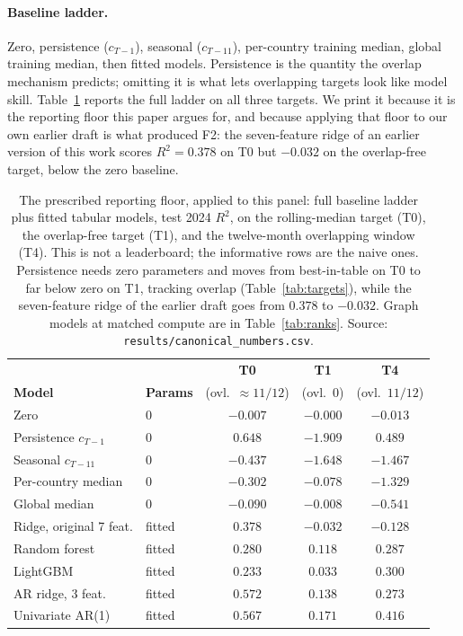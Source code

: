 \documentclass[10pt]{article}
\begin{document}
\paragraph{Baseline ladder.}
Zero, persistence ($c_{T-1}$), seasonal ($c_{T-11}$), per-country training median, global training median, then fitted models. Persistence is the quantity the overlap mechanism predicts; omitting it is what lets overlapping targets look like model skill. Table~\ref{tab:ladder} reports the full ladder on all three targets. We print it because it is the reporting floor this paper argues for, and because applying that floor to our own earlier draft is what produced F2: the seven-feature ridge of an earlier version of this work scores $R^2=0.378$ on T0 but $-0.032$ on the overlap-free target, below the zero baseline.

\begin{table}[t]
\centering
\caption{The prescribed reporting floor, applied to this panel: full baseline ladder plus fitted tabular models, test 2024 $R^2$, on the rolling-median target (T0), the overlap-free target (T1), and the twelve-month overlapping window (T4). This is not a leaderboard; the informative rows are the naive ones. Persistence needs zero parameters and moves from best-in-table on T0 to far below zero on T1, tracking overlap (Table~\ref{tab:targets}), while the seven-feature ridge of the earlier draft goes from $0.378$ to $-0.032$. Graph models at matched compute are in Table~\ref{tab:ranks}. Source: \texttt{results/canonical\_numbers.csv}.}
\label{tab:ladder}
\footnotesize
\begin{tabular}{l l ccc}
\toprule
& & \textbf{T0} & \textbf{T1} & \textbf{T4} \\
\textbf{Model} & \textbf{Params} & (ovl.\ $\approx 11/12$) & (ovl.\ $0$) & (ovl.\ $11/12$) \\
\midrule
Zero & $0$ & $-0.007$ & $-0.000$ & $-0.013$ \\
Persistence $c_{T-1}$ & $0$ & $\mathbf{0.648}$ & $-1.909$ & $0.489$ \\
Seasonal $c_{T-11}$ & $0$ & $-0.437$ & $-1.648$ & $-1.467$ \\
Per-country median & $0$ & $-0.302$ & $-0.078$ & $-1.329$ \\
Global median & $0$ & $-0.090$ & $-0.008$ & $-0.541$ \\
\midrule
Ridge, original 7 feat. & fitted & $0.378$ & $-0.032$ & $-0.128$ \\
Random forest & fitted & $0.280$ & $0.118$ & $0.287$ \\
LightGBM & fitted & $0.233$ & $0.033$ & $0.300$ \\
AR ridge, 3 feat. & fitted & $0.572$ & $0.138$ & $0.273$ \\
Univariate AR(1) & fitted & $0.567$ & $\mathbf{0.171}$ & $0.416$ \\
\bottomrule
\end{tabular}
\end{table}
\end{document}
